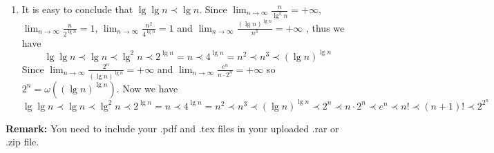 \documentclass[12pt,a4paper]{article}
\makeatletter
\newtheorem*{solution}{Solution}
\theoremstyle{definition}
\renewenvironment{solution}[1][Solution] {\par\pushQED{\qed}\normalfont\topsep6\p@\@plus6\p@\relax\trivlist\item[\hskip\labelsep\bfseries#1\@addpunct{.}]\ignorespaces}{\popQED\endtrivlist\@endpefalse} \makeatother
\makeatother
\begin{document}
\begin{enumerate}
    \begin{solution}
        It is easy to conclude that $\lg\lg n \prec \lg n$. Since $\lim_{n\rightarrow\infty}\frac{n}{\lg^{2}n}=+\infty$, $\lim_{n\rightarrow\infty}\frac{n}{2^{\lg n}}=1$, $\lim_{n\rightarrow\infty}\frac{n^{2}}{4^{\lg n}}=1$ and $\lim_{n\rightarrow\infty}\frac{(\lg n)^{\lg n}}{n^3}=+\infty$ , thus we have $$\lg\lg n \prec \lg n \prec \lg^2 n \prec 2^{\lg n} = n \prec 4^{\lg n} = n^{2} \prec n^{3} \prec (\lg n)^{\lg n}$$
        Since $\lim_{n\rightarrow\infty}\frac{2^n}{(\lg n)^{\lg n}}=+\infty$ and $\lim_{n\rightarrow\infty}\frac{e^n}{n\cdot2^{n}}=+\infty$ so $2^{n} = \omega((\lg n)^{\lg n})$. Now we have $$\lg\lg n \prec \lg n \prec \lg^2 n \prec 2^{\lg n} = n \prec 4^{\lg n} = n^{2} \prec n^{3} \prec (\lg n)^{\lg n} \prec 2^{n} \prec n\cdot2^{n} \prec e^{n} \prec n! \prec (n+1)! \prec 2^{2^n}$$
    \end{solution}

\end{enumerate}

\vspace{20pt}

\textbf{Remark:} You need to include your .pdf and .tex files in your uploaded .rar or .zip file.

\end{document}
